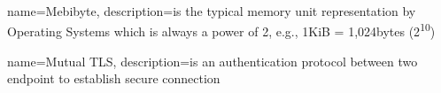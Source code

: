 \makeglossaries

{
  name=Mebibyte,
  description={is the typical memory unit representation by Operating Systems which is always a power of 2, e.g., 1KiB = 1,024bytes (2\textsuperscript{10})}
}

{
  name=Mutual TLS,
  description={is an authentication protocol between two endpoint to establish secure connection}
}

